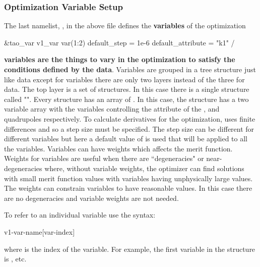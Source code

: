 \documentclass{hitec}     %
\begin{document}
{%
\subsubsection{Optimization Variable Setup}

The last namelist, , in the above  file defines the \textbf{variables} of the optimization
\begin{code}
&tao_var
  v1_var%
  var(1:2)%
  default_step = 1e-6
  default_attribute = "k1"
/
\end{code}
\textbf{variables are the things to vary in the optimization to satisfy the conditions defined by the data}. Variables are grouped
in a tree structure just like data except for variables there are only two layers instead of the three for data.
The top layer is a set of  structures. In this case there is a single  structure called
"". Every  structure has an array of . In this case, the   structure has a two variable array with the variables controlling the  attribute of the , and  quadrupoles respectively. 
To calculate derivatives for the optimization, \tao uses finite differences and so a step size must be specified.
The step size can be different for different variables but here a default value of  is used that will
be applied to all the variables. 
Variables can have weights which affects the merit function.
Weights for variables are useful when there are ``degeneracies" or near-degeneracies where, without variable weights, the optimizer can find solutions with small merit function values with variables having unphysically large values. The weights can
constrain variables to have reasonable values. In this case there are no degeneracies and variable weights are not needed.

To refer to an individual variable use the syntax:
\begin{code}
v1-var-name[var-index]
\end{code}
where  is the index of the variable. For example, the first variable in the 
structure is , etc.

}
\end{document}
